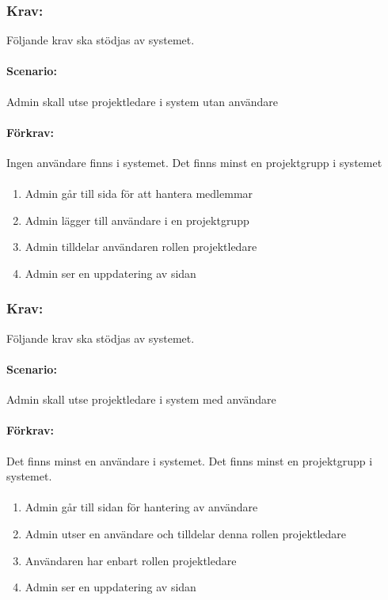 \documentclass[paper=a4, fontsize=11pt,twoside]{article}
\begin{document}
\subsubsection{Krav:} Följande krav ska stödjas av systemet. 
\paragraph{Scenario:}
Admin skall utse projektledare i system utan användare
\paragraph{Förkrav:}
Ingen användare finns i systemet. Det finns minst en projektgrupp i systemet
\paragraph{}
\begin{enumerate}
\item Admin går till sida för att hantera medlemmar
\item Admin lägger till användare i en projektgrupp
\item Admin tilldelar användaren rollen projektledare
\item Admin ser en uppdatering av sidan
\end{enumerate}

\subsubsection{Krav:} Följande krav ska stödjas av systemet. 
\paragraph{Scenario:}
Admin skall utse projektledare i system med användare
\paragraph{Förkrav:}
Det finns minst en användare i systemet. Det finns minst en projektgrupp i systemet.
\paragraph{}
\begin{enumerate}
\item Admin går till sidan för hantering av användare
\item Admin utser en användare och tilldelar denna rollen projektledare
\item Användaren har enbart rollen projektledare
\item Admin ser en uppdatering av sidan
\end{enumerate}
\end{document}
